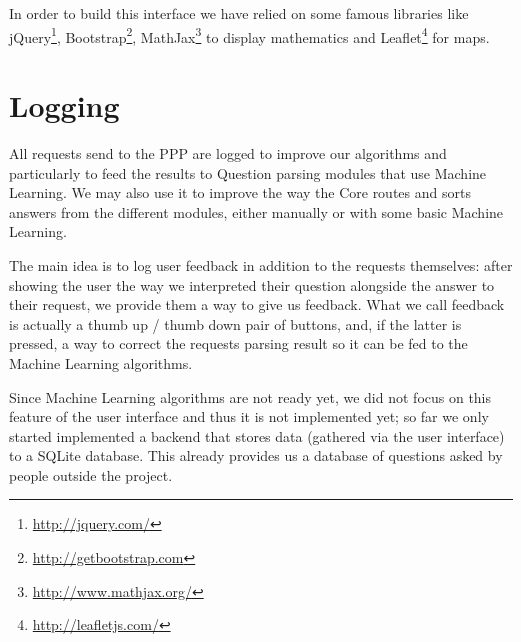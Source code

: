 In order to build this interface we have relied on some famous libraries 
like jQuery\footnote{\url{http://jquery.com/}}, Bootstrap\footnote{\url{http://getbootstrap.com}}, MathJax\footnote{\url{http://www.mathjax.org/}} to display mathematics and Leaflet\footnote{\url{http://leafletjs.com/}} for maps.

\section{Logging}

All requests send to the PPP are logged to improve our algorithms
and particularly to feed the results to Question parsing
modules that use Machine Learning.
We may also use it to improve the way the Core routes and sorts answers
from the different modules, either manually or with some basic
Machine Learning.

The main idea is to log user feedback in addition to the requests
themselves: after showing the user the way we interpreted their
question alongside the answer to their request, we provide them a
way to give us feedback.
What we call feedback is actually a thumb up / thumb down pair of
buttons, and, if the latter is pressed, a way to correct the requests
parsing result so it can be fed to the Machine Learning algorithms.

Since Machine Learning algorithms are not ready yet, we did not focus
on this feature of the user interface and thus it is not implemented yet;
so far we only started implemented a backend that stores data
(gathered via the user interface) to a SQLite database.
This already provides us a database of questions asked by people
outside the project.
